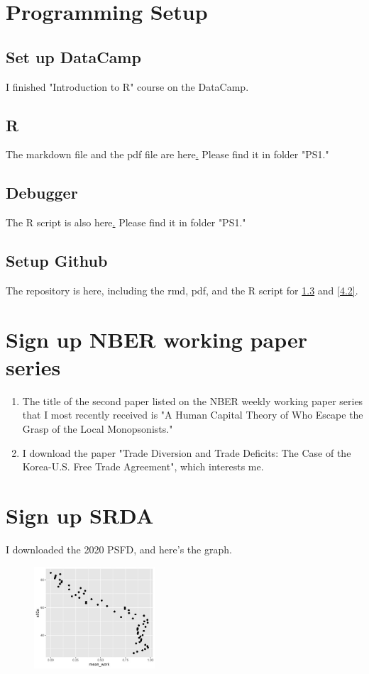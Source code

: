 \documentclass[12pt]{article}
\begin{document}
\section{Programming Setup}

\subsection{Set up DataCamp}
I finished "Introduction to R" course on the DataCamp.

\subsection{R}
The markdown file and the pdf file are here\href{https://github.com/JayChang426/ECON-7069.git}.\label{web} Please find it in folder "PS1."

\subsection{Debugger} \label{1.3}
The R script is also here\href{https://github.com/JayChang426/ECON-7069.git}.\label{web} Please find it in folder "PS1."

\subsection{Setup Github}
The repository is here\href{https://github.com/JayChang426/ECON-7069.git}, \label{web}
including the rmd, pdf, and the R script for \ref{1.3} and \ref{4.2}.

\section{Sign up NBER working paper series}
\begin{enumerate}
    \item The title of the second paper listed on the NBER weekly working paper series that I most recently received is "A Human Capital Theory of Who Escape the Grasp of the Local Monopsonists."
    \item I download the paper "Trade Diversion and Trade Deficits: The Case of the Korea-U.S. Free Trade Agreement", which interests me.
\end{enumerate}

\section{Sign up SRDA}
I downloaded the 2020 PSFD, and here's the graph.
\begin{figure}[H]
    \centering
    \includegraphics[width=0.4\textwidth]{rate of working against age.jpeg}
\end{figure}
\end{document}
